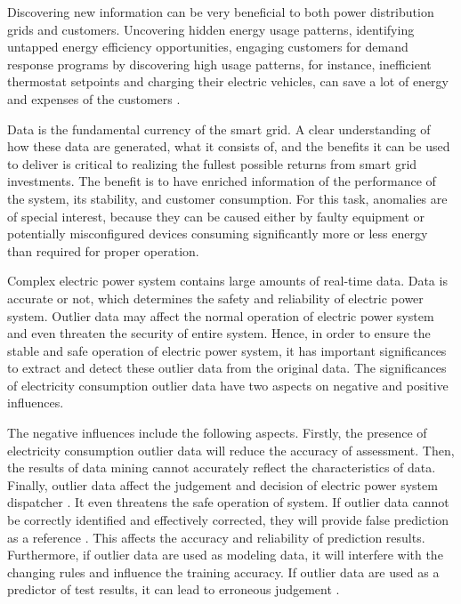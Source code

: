 Discovering new information can be very beneficial to both power distribution grids and customers. Uncovering hidden energy usage patterns, identifying untapped energy efficiency opportunities, engaging customers for demand response programs by discovering high usage patterns, for instance, inefficient thermostat setpoints and charging their electric vehicles, can save a lot of energy and expenses of the customers \cite{ben7utilities}. 


Data is the fundamental currency of the smart grid. A clear understanding of how these data are generated, what it consists of, and the benefits it can be used to deliver is critical to realizing the fullest possible returns from smart grid investments. The benefit is to have enriched information of the performance of the system, its stability, and customer consumption. For this task, anomalies are of special interest, because they can be caused either by faulty equipment or potentially misconfigured devices consuming significantly more or less energy than required for proper operation.


Complex electric power system contains large amounts of real-time data. Data is accurate or not, which determines the safety and reliability of electric power system. Outlier data may affect the normal operation of electric power system and even threaten the security of entire system. Hence, in order to ensure the stable and safe operation of electric power system, it has important significances to extract and detect these outlier data from the original data. The significances of electricity consumption outlier data have two aspects on negative and positive influences.

The negative influences include the following aspects. Firstly, the presence of electricity consumption outlier data will reduce the accuracy of assessment. Then, the results of data mining cannot accurately reflect the characteristics of data. Finally, outlier data affect the judgement and decision of electric power system dispatcher \cite{huang2004enhancement}. It even threatens the safe operation of system. If outlier data cannot be correctly identified and effectively corrected, they will provide false prediction as a reference \cite{pham2014anomaly}. This affects the accuracy and reliability of prediction results. Furthermore, if outlier data are used as modeling data, it will interfere with the changing rules and influence the training accuracy. If outlier data are used as a predictor of test results, it can lead to erroneous judgement \cite{mao2005principle}.

